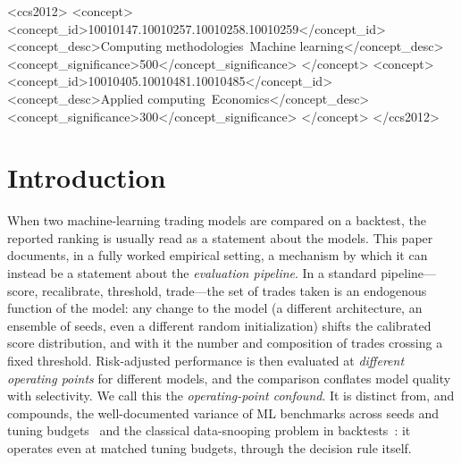 \documentclass[sigconf,review]{acmart}
\begin{document}
\begin{CCSXML}
<ccs2012>
 <concept>
  <concept_id>10010147.10010257.10010258.10010259</concept_id>
  <concept_desc>Computing methodologies~Machine learning</concept_desc>
  <concept_significance>500</concept_significance>
 </concept>
 <concept>
  <concept_id>10010405.10010481.10010485</concept_id>
  <concept_desc>Applied computing~Economics</concept_desc>
  <concept_significance>300</concept_significance>
 </concept>
</ccs2012>
\end{CCSXML}



\maketitle

\section{Introduction}
\label{sec:intro}

When two machine-learning trading models are compared on a backtest, the reported ranking is usually read as a statement about the models. This paper documents, in a fully worked empirical setting, a mechanism by which it can instead be a statement about the \emph{evaluation pipeline}. In a standard pipeline---score, recalibrate, threshold, trade---the set of trades taken is an endogenous function of the model: any change to the model (a different architecture, an ensemble of seeds, even a different random initialization) shifts the calibrated score distribution, and with it the number and composition of trades crossing a fixed threshold. Risk-adjusted performance is then evaluated at \emph{different operating points} for different models, and the comparison conflates model quality with selectivity. We call this the \emph{operating-point confound}. It is distinct from, and compounds, the well-documented variance of ML benchmarks across seeds and tuning budgets~\cite{bouthillier2021accounting,dodge2019show,melis2018state,lucic2018gans,agarwal2021deep} and the classical data-snooping problem in backtests~\cite{white2000reality,hansen2005spa,harvey2016crosssection,bailey2014deflated}: it operates even at matched tuning budgets, through the decision rule itself.
\end{document}
